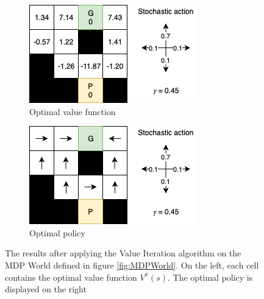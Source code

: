 \begin{figure}[h!]
  \centering
  \begin{subfigure}[b]{0.3\linewidth}
    \includegraphics[width=\linewidth]{images/MDPWorldResult.png}
     \caption{Optimal value function}
  \end{subfigure}
  \hspace{1.3cm}
  \begin{subfigure}[b]{0.3\linewidth}
    \includegraphics[width=\linewidth]{images/MDPWorldResultPolicy.png}
     \caption{Optimal policy}
  \end{subfigure}
  \caption{The results after applying the Value Iteration algorithm on the MDP World defined in figure \ref{fig:MDPWorld}. On the left, each cell contains the optimal value function $V^{\pi}(s)$. The optimal policy is displayed on the right}
  \label{fig:MDPResults}
\end{figure}

